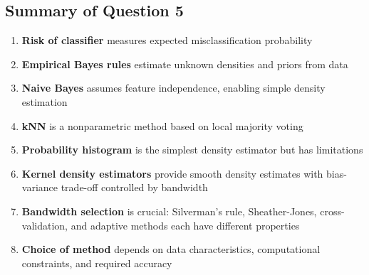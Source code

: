 \documentclass[12pt,a4paper]{article}
\begin{document}
\subsection{Summary of Question 5}

\begin{enumerate}
    \item \textbf{Risk of classifier} measures expected misclassification probability
    \item \textbf{Empirical Bayes rules} estimate unknown densities and priors from data
    \item \textbf{Naive Bayes} assumes feature independence, enabling simple density estimation
    \item \textbf{kNN} is a nonparametric method based on local majority voting
    \item \textbf{Probability histogram} is the simplest density estimator but has limitations
    \item \textbf{Kernel density estimators} provide smooth density estimates with bias-variance trade-off controlled by bandwidth
    \item \textbf{Bandwidth selection} is crucial: Silverman's rule, Sheather-Jones, cross-validation, and adaptive methods each have different properties
    \item \textbf{Choice of method} depends on data characteristics, computational constraints, and required accuracy
\end{enumerate}
\end{document}
